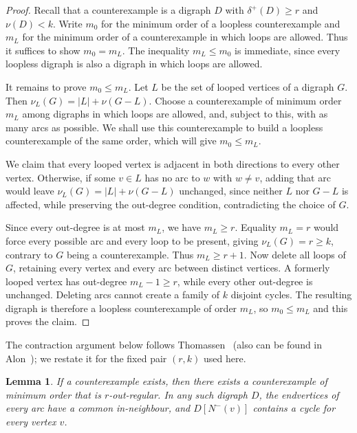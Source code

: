 \documentclass[10pt,a4paper]{article}
\newtheorem{lemma}[theorem]{Lemma}
\numberwithin{equation}{section}
\newcommand{\jbjcomment}[1]{\textcolor{blue}{JBJ: #1}}
\begin{document}
\begin{proof}Recall that a counterexample is a digraph $D$ with $\delta^+(D)\ge r$ and $\nu(D)<k$. 
Write $m_0$ for the minimum order of a loopless counterexample and
$m_L$ for the minimum order of a counterexample in which loops are
allowed. Thus it suffices to show $m_0=m_L$.
The inequality $m_L\le m_0$ is immediate, since every loopless
digraph is also a digraph in which loops are allowed.

It remains to prove $m_0\le m_L$. Let $L$ be the set of looped
vertices of a digraph $G$. Then $\nu_L(G)=|L|+\nu(G-L)$.  %
Choose a counterexample of minimum order $m_L$ among digraphs in
which loops are allowed, and, subject to this, with as many arcs as
possible.  We shall use this counterexample to build a loopless counterexample
of the same order, which will give $m_0\le m_L$.

We claim that every looped vertex is adjacent in both
directions to every other vertex. Otherwise, if some $v\in L$ has no
arc to $w$ with $w\ne v$, adding that arc would leave
$\nu_L(G)=|L|+\nu(G-L)$ unchanged, since neither $L$ nor
$G-L$ is affected, while preserving the out-degree condition,
contradicting the choice of $G$.

Since every out-degree is at most $m_L$, we have $m_L\ge r$. Equality
$m_L=r$ would force every possible arc and every loop to be present,
giving $\nu_L(G)=r\ge k$, contrary to $G$ being a counterexample.
Thus $m_L\ge r+1$. Now delete all loops of $G$, retaining every vertex and every arc
between distinct vertices. A formerly looped vertex has out-degree
$m_L-1\ge r$, while every other out-degree is unchanged. Deleting arcs
cannot create a family of $k$ disjoint cycles. The resulting digraph
is therefore a loopless counterexample of order $m_L$, so
$m_0\le m_L$ and this proves the claim.
\end{proof}


The contraction argument below follows Thomassen~\cite{thomassenC3} (also can be found in Alon~\cite[Claims~1 and~2]{alonJCTB68}); we restate it for the fixed pair $(r,k)$ used here. %


\begin{lemma}\label{lem:structure}
If a counterexample exists, then there exists a counterexample of minimum
order that is $r$-out-regular. In any such digraph $D$, the endvertices
of every arc have a common in-neighbour, and $D[N^-(v)]$ contains a cycle for every vertex $v$.
\end{lemma}
\end{document}
